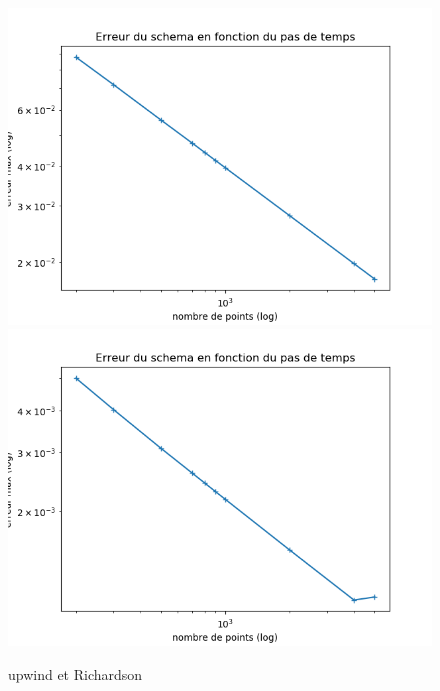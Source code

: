 \documentclass[12pt]{article}
\begin{document}
\begin{figure}[H]
	\centering
	\includegraphics[scale=0.40]{erreur_schema1_init1.png}
	\includegraphics[scale=0.40]{erreur_schema2_init1.png}
	\caption{upwind et Richardson}
	\label{1D}
	\end{figure}	
\end{document}

